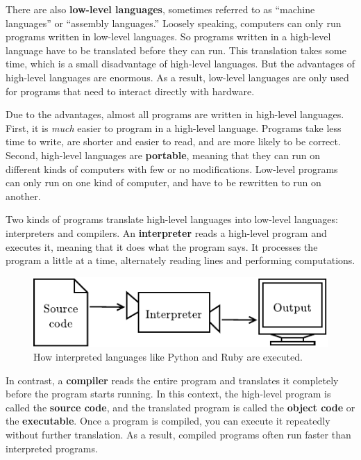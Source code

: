 \documentclass[12pt]{book}
\theoremstyle{exercise}
\begin{document}
There are also {\bf low-level languages}, sometimes referred to as ``machine languages'' or ``assembly languages.''
Loosely speaking, computers can only run programs written in low-level languages.
So programs written in a high-level language have to be translated before they can run.
This translation takes some time, which is a small disadvantage of high-level languages.
But the advantages of high-level languages are enormous.
As a result, low-level languages are only used for programs that need to interact directly with hardware.


Due to the advantages, almost all programs are written in high-level languages.
First, it is {\em much} easier to program in a high-level language.
Programs take less time to write, are shorter and easier to read, and are more likely to be correct.
Second, high-level languages are {\bf portable}, meaning that they can run on different kinds of computers with few or no modifications.
Low-level programs can only run on one kind of computer, and have to be rewritten to run on another.


Two kinds of programs translate high-level languages into low-level languages: interpreters and compilers.
An {\bf interpreter} reads a high-level program and executes it, meaning that it does what the program says.
It processes the program a little at a time, alternately reading lines and performing computations.

\begin{figure}[!h]
\begin{center}
\includegraphics{figs/interpreter.pdf}
\caption{How interpreted languages like Python and Ruby are executed.}
\end{center}
\end{figure}


In contrast, a {\bf compiler} reads the entire program and translates it completely before the program starts running.
In this context, the high-level program is called the {\bf source code}, and the translated program is called the {\bf object code} or the {\bf executable}.
Once a program is compiled, you can execute it repeatedly without further translation.
As a result, compiled programs often run faster than interpreted programs.
\end{document}

